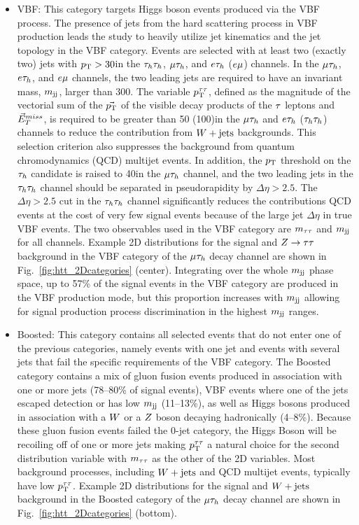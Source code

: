 \begin{itemize}
\item {VBF}: This category targets Higgs boson events produced via the VBF process.
The presence of jets from the hard scattering process in VBF production leads the study to heavily
utilize jet kinematics and the jet topology in the VBF category.
Events are selected with at least two (exactly two) jets with $p_\mathrm{T}>30$\GeV in the
$\tau_{h}\tau_{h}$, $\mu\tau_{h}$, and $e\tau_{h}$ ($e\mu$) channels.
In the $\mu\tau_{h}$, $e\tau_{h}$, and $e\mu$ channels, the two leading jets are required to have 
an invariant mass, $m_\mathrm{jj}$, larger than 300\GeV. The variable $p_\mathrm{T}^{\tau\tau}$, defined as the magnitude 
of the vectorial sum of the $\vec{p_\mathrm{T}}$ of the visible decay products of the $\tau$ leptons 
and $\vec{E}^{miss}_T$, is required to be greater than 50 (100)\GeV in the $\mu\tau_{h}$
 and $e\tau_{h}$ ($\tau_{h}\tau_{h}$) channels to reduce the contribution from $W+\text{jets}$ 
backgrounds. This selection criterion also suppresses the background from quantum 
chromodynamics (QCD) multijet events. In addition, the $p_\mathrm{T}$ threshold on the $\tau_{h}$ 
candidate is raised to 40\GeV in the $\mu\tau_{h}$ channel, and the two leading jets in the 
$\tau_{h}\tau_{h}$ channel should be separated in pseudorapidity by $\Delta\eta>2.5$. The $\Delta\eta>2.5$
cut in the $\tau_{h}\tau_{h}$ channel significantly reduces the contributions QCD events at the cost
of very few signal events because of the large jet $\Delta\eta$ in true VBF events.
The two observables used in the VBF category are $m_{\tau\tau}$ and $m_\mathrm{jj}$ for all channels. Example 2D 
distributions for the signal and $Z\to\tau\tau$ background
in the VBF category of the $\mu\tau_{h}$ decay channel are shown in Fig.~\ref{fig:htt_2Dcategories} (center). 
Integrating over the whole $m_\mathrm{jj}$ phase space, up to 57\% of the signal events in the VBF 
category are produced in the VBF production mode, but this proportion increases with $m_\mathrm{jj}$ allowing
for signal production process discrimination in the highest $m_\mathrm{jj}$ ranges.\\

\item {Boosted}: This category contains all selected events that do not enter one of the previous 
categories, namely events with one jet and events with several jets that fail the specific requirements of the VBF category.
The Boosted category contains a mix of gluon fusion events produced in association with one or more jets (78--80\% of signal events),
VBF events where one of the jets escaped detection or has low $m_\mathrm{jj}$ (11--13\%), as well as
Higgs bosons produced in association with a $W$ or a $Z$ boson decaying hadronically (4--8\%).
Because these gluon fusion events failed the 0-jet category, the Higgs Boson will be recoiling 
off of one or more jets making $p_\mathrm{T}^{\tau\tau}$ a natural choice for the second distribution variable with
$m_{\tau\tau}$ as the other of the 2D variables. 
Most background processes, including $W+\text{jets}$ and QCD multijet events, typically have low $p_\mathrm{T}^{\tau\tau}$. 
Example 2D distributions for the signal and $W+\text{jets}$ background in the Boosted category of 
the $\mu\tau_{h}$ decay channel are shown in Fig.~\ref{fig:htt_2Dcategories} (bottom).
\end{itemize}

